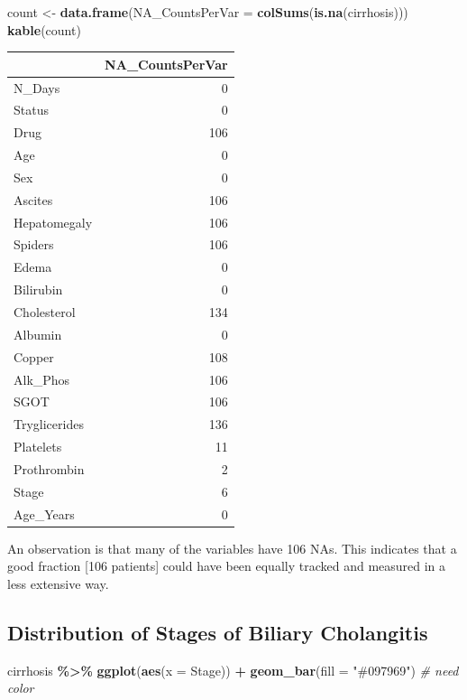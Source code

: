 \documentclass[
]{article}
\newenvironment{Shaded}{\begin{snugshade}}{\end{snugshade}}
\newcommand{\AttributeTok}[1]{\textcolor[rgb]{0.13,0.29,0.53}{#1}}
\newcommand{\CommentTok}[1]{\textcolor[rgb]{0.56,0.35,0.01}{\textit{#1}}}
\newcommand{\FunctionTok}[1]{\textcolor[rgb]{0.13,0.29,0.53}{\textbf{#1}}}
\newcommand{\NormalTok}[1]{#1}
\newcommand{\OtherTok}[1]{\textcolor[rgb]{0.56,0.35,0.01}{#1}}
\newcommand{\SpecialCharTok}[1]{\textcolor[rgb]{0.81,0.36,0.00}{\textbf{#1}}}
\newcommand{\StringTok}[1]{\textcolor[rgb]{0.31,0.60,0.02}{#1}}
\begin{document}
\begin{Shaded}
\begin{Highlighting}[]
\NormalTok{count }\OtherTok{\textless{}{-}}  \FunctionTok{data.frame}\NormalTok{(}\AttributeTok{NA\_CountsPerVar =} \FunctionTok{colSums}\NormalTok{(}\FunctionTok{is.na}\NormalTok{(cirrhosis)))}
\FunctionTok{kable}\NormalTok{(count)}
\end{Highlighting}
\end{Shaded}

\begin{tabular}{l|r}
\hline
  & NA\_CountsPerVar\\
\hline
N\_Days & 0\\
\hline
Status & 0\\
\hline
Drug & 106\\
\hline
Age & 0\\
\hline
Sex & 0\\
\hline
Ascites & 106\\
\hline
Hepatomegaly & 106\\
\hline
Spiders & 106\\
\hline
Edema & 0\\
\hline
Bilirubin & 0\\
\hline
Cholesterol & 134\\
\hline
Albumin & 0\\
\hline
Copper & 108\\
\hline
Alk\_Phos & 106\\
\hline
SGOT & 106\\
\hline
Tryglicerides & 136\\
\hline
Platelets & 11\\
\hline
Prothrombin & 2\\
\hline
Stage & 6\\
\hline
Age\_Years & 0\\
\hline
\end{tabular}

An observation is that many of the variables have 106 NAs. This
indicates that a good fraction {[}106 patients{]} could have been
equally tracked and measured in a less extensive way.

\hypertarget{distribution-of-stages-of-biliary-cholangitis}{%
\subsection{Distribution of Stages of Biliary
Cholangitis}\label{distribution-of-stages-of-biliary-cholangitis}}

\begin{Shaded}
\begin{Highlighting}[]
\NormalTok{cirrhosis }\SpecialCharTok{\%\textgreater{}\%}
      \FunctionTok{ggplot}\NormalTok{(}\FunctionTok{aes}\NormalTok{(}\AttributeTok{x =}\NormalTok{ Stage)) }\SpecialCharTok{+} \FunctionTok{geom\_bar}\NormalTok{(}\AttributeTok{fill =} \StringTok{"\#097969"}\NormalTok{) }\CommentTok{\# need color}
\end{Highlighting}
\end{Shaded}
\end{document}
